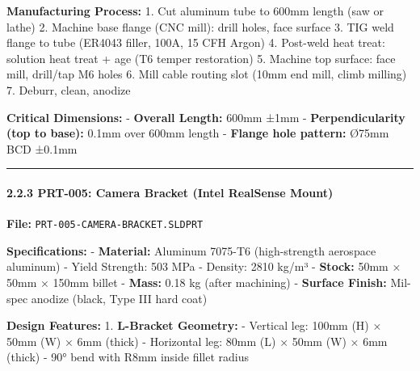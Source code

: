 \documentclass[
]{article}
\begin{document}
\textbf{Manufacturing Process:} 1. Cut aluminum tube to 600mm length
(saw or lathe) 2. Machine base flange (CNC mill): drill holes, face
surface 3. TIG weld flange to tube (ER4043 filler, 100A, 15 CFH Argon)
4. Post-weld heat treat: solution heat treat + age (T6 temper
restoration) 5. Machine top surface: face mill, drill/tap M6 holes 6.
Mill cable routing slot (10mm end mill, climb milling) 7. Deburr, clean,
anodize

\textbf{Critical Dimensions:} - \textbf{Overall Length:} 600mm ±1mm -
\textbf{Perpendicularity (top to base):} 0.1mm over 600mm length -
\textbf{Flange hole pattern:} Ø75mm BCD ±0.1mm

\begin{center}\rule{0.5\linewidth}{0.5pt}\end{center}

\hypertarget{prt-005-camera-bracket-intel-realsense-mount}{%
\paragraph{2.2.3 PRT-005: Camera Bracket (Intel RealSense
Mount)}\label{prt-005-camera-bracket-intel-realsense-mount}}

\textbf{File:} \texttt{PRT-005-CAMERA-BRACKET.SLDPRT}

\textbf{Specifications:} - \textbf{Material:} Aluminum 7075-T6
(high-strength aerospace aluminum) - Yield Strength: 503 MPa - Density:
2810 kg/m³ - \textbf{Stock:} 50mm × 50mm × 150mm billet - \textbf{Mass:}
0.18 kg (after machining) - \textbf{Surface Finish:} Mil-spec anodize
(black, Type III hard coat)

\textbf{Design Features:} 1. \textbf{L-Bracket Geometry:} - Vertical
leg: 100mm (H) × 50mm (W) × 6mm (thick) - Horizontal leg: 80mm (L) ×
50mm (W) × 6mm (thick) - 90° bend with R8mm inside fillet radius
\end{document}

